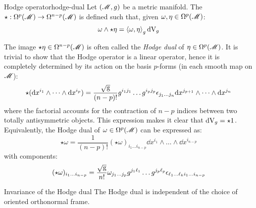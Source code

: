 \begin{definition}{Hodge operator}{hodge-dual}
  Let $ (\mathscr{M},g) $ be a metric manifold. The  $ \star : \Omega^{p}(\mathscr{M}) \rightarrow \Omega^{n-p}(\mathscr{M}) $ is defined such that, given $ \omega , \eta \in \Omega^{p}(\mathscr{M}) $:
  \begin{equation}
    \omega \wedge \star \eta = \braket{\omega , \eta}_g \mathrm{d} \mathrm{V}_g
    \label{eq:hodge-def}
  \end{equation}
\end{definition}

The image $ \star \eta \in \Omega^{n-p}(\mathscr{M}) $ is often called the \emph{Hodge dual} of $ \eta \in \Omega^{p}(\mathscr{M}) $. It is trivial to show that the Hodge operator is a linear operator, hence it is completely determined by its action on the basis $ p $-forms (in each smooth map on $ \mathscr{M} $):
\begin{equation}
  \star ( \mathrm{d} x^{i_1} \wedge \dots \wedge \mathrm{d} x^{i_p} ) = \frac{\sqrt{\mathrm{g}}}{(n-p)!} g^{i_1 j_1} \dots g^{i_p j_p} \epsilon_{j_1 \dots j_n} \mathrm{d} x^{j_{p+1}} \wedge \dots \wedge \mathrm{d} x^{j_n}
  \label{eq:hodge-alibi}
\end{equation}
where the factorial accounts for the contraction of $ n-p $ indices between two totally antisymmetric objects. This expression makes it clear that $ \mathrm{d} \mathrm{V}_g = \star 1 $. Equivalently, the Hodge dual of $ \omega \in \Omega^{p}(\mathscr{M}) $ can be expressed as:
\begin{equation*}
  \star \omega = \frac{1}{(n-p)!} (\star \omega)_{i_1 \dots i_{n-p}} \dd x^{i_1} \wedge \dots \wedge \dd x^{i_{n-p}}
\end{equation*}
with components:
\begin{equation}
  (\star \omega)_{i_1 \dots i_{n-p}} = \frac{\sqrt{\mathrm{g}}}{n!} \omega_{j_1 \dots j_p} g^{j_1 \ell_1} \dots g^{j_p \ell_p} \epsilon_{\ell_1 \dots \ell_k i_1 \dots i_{n-p}}
  \label{eq:hodge-alias}
\end{equation}

\begin{lemma}{Invariance of the Hodge dual}{}
  The Hodge dual is independent of the choice of oriented orthonormal frame.
\end{lemma}

